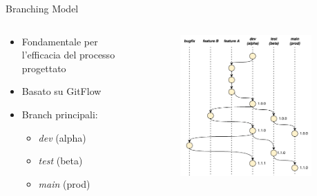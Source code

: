     \begin{frame}{Branching Model}
        \begin{columns}[onlytextwidth]
            \begin{column}{0.5\textwidth}
                \begin{itemize}
                    \item Fondamentale per l'efficacia del processo progettato
                    \item Basato su GitFlow
                    \item Branch principali:
                    \begin{itemize}
                        \item \textit{dev} (alpha)
                        \item \textit{test} (beta)
                        \item \textit{main} (prod)
                    \end{itemize}
                \end{itemize}
            \end{column}
            \begin{column}{0.5\textwidth}
                \begin{figure}[H]
                    \centering
                    \includegraphics[width=0.9\textwidth]{img/tesi-13-branching.drawio.png}
                \end{figure}
            \end{column}
        \end{columns}
    \end{frame}
    
